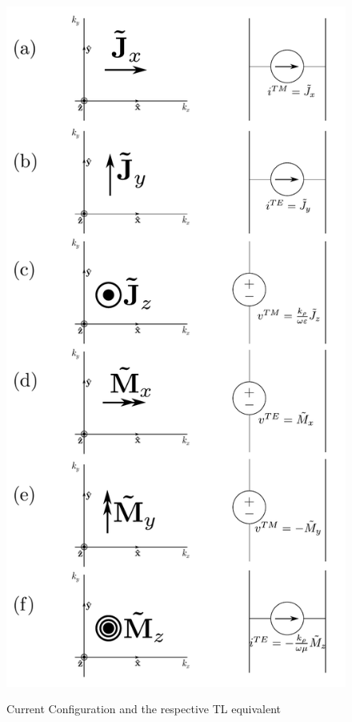 \documentclass[11pt]{article}
\renewcommand{\^}{\hat}  %
\begin{document}
  \begin{figure}[t!]
    \centering
    {\includegraphics[scale=.6]{source_configuration.pdf}}
    \caption{Current Configuration and the respective TL equivalent}
    \label{fig:Sources}
  \end{figure}

  
  
\end{document}
